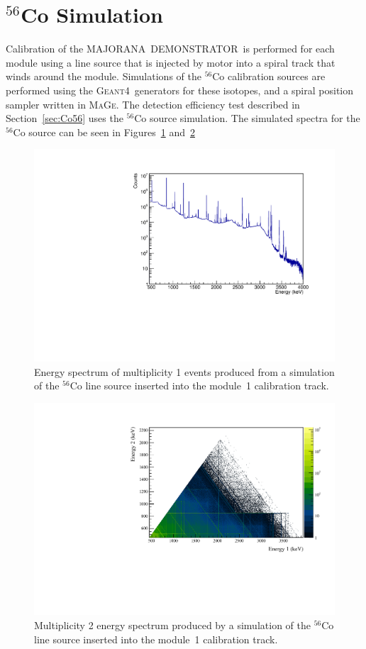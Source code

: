 \documentclass[notitlepage,rmp,aps,10pt]{revtex4-1}
\newcommand{\MJ}{M{\footnotesize AJORANA}}
\newcommand{\Demo}{D{\footnotesize EMON\-STRAT\-OR}}
\newcommand{\MJD}{\MJ\ \Demo}
\newcommand{\Mage}{\textsc{MaGe}}
\newcommand{\geant}{\textsc{Geant4}}
\newcommand{\iso}[2]{$^{#1}$#2}
\newcommand{\Co}[1]{\iso{#1}{Co}}
\begin{document}
\section{\Co{56} Simulation} \label{sec:calsims}
Calibration of the \MJD\ is performed for each module using a line source that is injected by motor into a spiral track that winds around the module.
Simulations of the \Co{56} calibration sources are performed using the \geant\ generators for these isotopes, and a spiral position sampler written in \Mage.
The detection efficiency test described in Section~\ref{sec:Co56} uses the \Co{56} source simulation.
The simulated spectra for the \Co{56} source can be seen in Figures~\ref{fig:56Co1D} and~\ref{fig:Co56Sim2D}
\begin{figure}
  \centering
  \includegraphics[width=.8\linewidth]{Co56Sim1D}
  \caption[Simulation of multiplicty 1 events from \Co{56} line source]{ \label{fig:56Co1D}
    Energy spectrum of multiplicity 1 events produced from a simulation of the \Co{56} line source inserted into the module~1 calibration track.
  }
\end{figure}

\begin{figure}
  \centering
  \includegraphics[width=.8\linewidth]{Co56Sim2D}
  \caption[Simulation of multiplicty 2 events from \Co{56} line source]{ \label{fig:Co56Sim2D}
    Multiplicity 2 energy spectrum produced by a simulation of the \Co{56} line source inserted into the module~1 calibration track.
  }
\end{figure}
\end{document}
